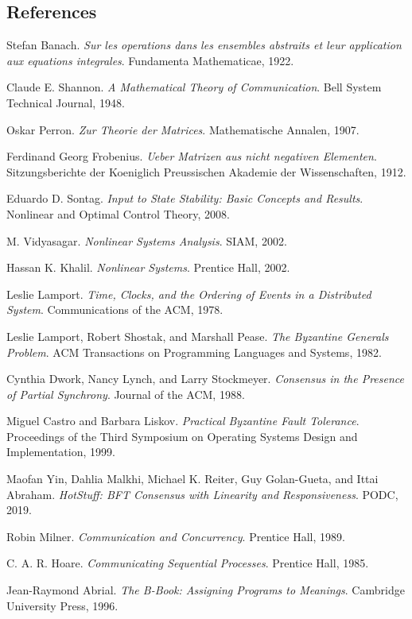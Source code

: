 \documentclass[10pt,oneside]{article}
\theoremstyle{definition}
\theoremstyle{remark}
\begin{document}
\subsection*{References}
\begin{enumerate}[label={[\arabic*]}]
  \item Stefan Banach. \emph{Sur les operations dans les ensembles abstraits et leur application aux equations integrales}. Fundamenta Mathematicae, 1922.
  \item Claude E. Shannon. \emph{A Mathematical Theory of Communication}. Bell System Technical Journal, 1948.
  \item Oskar Perron. \emph{Zur Theorie der Matrices}. Mathematische Annalen, 1907.
  \item Ferdinand Georg Frobenius. \emph{Ueber Matrizen aus nicht negativen Elementen}. Sitzungsberichte der Koeniglich Preussischen Akademie der Wissenschaften, 1912.
  \item Eduardo D. Sontag. \emph{Input to State Stability: Basic Concepts and Results}. Nonlinear and Optimal Control Theory, 2008.
  \item M. Vidyasagar. \emph{Nonlinear Systems Analysis}. SIAM, 2002.
  \item Hassan K. Khalil. \emph{Nonlinear Systems}. Prentice Hall, 2002.
  \item Leslie Lamport. \emph{Time, Clocks, and the Ordering of Events in a Distributed System}. Communications of the ACM, 1978.
  \item Leslie Lamport, Robert Shostak, and Marshall Pease. \emph{The Byzantine Generals Problem}. ACM Transactions on Programming Languages and Systems, 1982.
  \item Cynthia Dwork, Nancy Lynch, and Larry Stockmeyer. \emph{Consensus in the Presence of Partial Synchrony}. Journal of the ACM, 1988.
  \item Miguel Castro and Barbara Liskov. \emph{Practical Byzantine Fault Tolerance}. Proceedings of the Third Symposium on Operating Systems Design and Implementation, 1999.
  \item Maofan Yin, Dahlia Malkhi, Michael K. Reiter, Guy Golan-Gueta, and Ittai Abraham. \emph{HotStuff: BFT Consensus with Linearity and Responsiveness}. PODC, 2019.
  \item Robin Milner. \emph{Communication and Concurrency}. Prentice Hall, 1989.
  \item C. A. R. Hoare. \emph{Communicating Sequential Processes}. Prentice Hall, 1985.
  \item Jean-Raymond Abrial. \emph{The B-Book: Assigning Programs to Meanings}. Cambridge University Press, 1996.

\end{enumerate}
\end{document}
